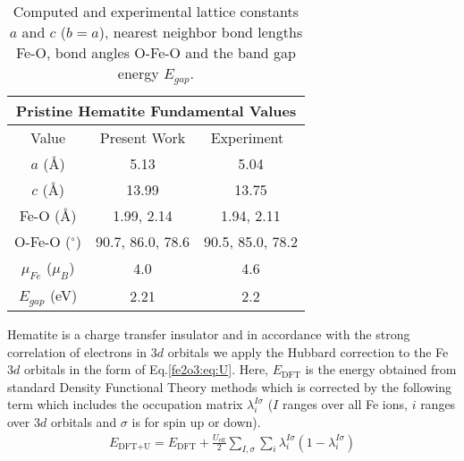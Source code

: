 \begin{table}[H]
    \footnotesize
    \centering
    \begin{tabular}{c c c}
         \hline
         \multicolumn{3}{c}{ Pristine Hematite Fundamental Values \vspace{0.5mm}} \\
         \hline
         Value & Present Work & Experiment~\cite{finger1980crystal} \\
         \hline
         $a$ ({\AA}) & 5.13  & 5.04 \\
         $c$ ({\AA}) & 13.99  & 13.75 \\
         Fe-O ({\AA}) & 1.99, 2.14  & 1.94, 2.11 \\
         O-Fe-O ($^{\circ}$) &  90.7, 86.0, 78.6 & 90.5, 85.0, 78.2 \\
         $\mu_{Fe}$ ($\mu_B$) & 4.0 & 4.6 \cite{coey1971study} \\
         $E_{gap}$ (eV) &  2.21  & 2.2  \cite{gilbert2009band}\\
         \hline
    \end{tabular}
    \caption{Computed and experimental lattice constants $a$ and $c$ ($b=a$), nearest neighbor bond lengths Fe-O, bond angles O-Fe-O and the band gap energy $E_{gap}$.}
    \label{fe2o3:table:pristine}
\end{table}

Hematite is a charge transfer insulator \cite{drager1992high,catti1995theoretical} and in accordance with the strong correlation of electrons in $3d$ orbitals we apply the Hubbard correction \cite{dudarev1998electron} to the Fe $3d$ orbitals in the form of Eq.\ref{fe2o3:eq:U}. Here, $E_\text{DFT}$ is the energy obtained from standard Density Functional Theory methods which is corrected by the following term which includes the occupation matrix $\lambda_i^{I\sigma}$ ($I$ ranges over all Fe ions, $i$ ranges over $3d$ orbitals and $\sigma$ is for spin up or down).
 \begin{align}
    E_{\text{DFT}+\text{U}}=E_{\text{DFT}}+\frac{U_{\text{eff}}}{2}\sum_{I,\sigma}\sum_{i}\lambda_{i}^{I\sigma}(1-\lambda_{i}^{I\sigma}) \label{fe2o3:eq:U}
\end{align}


